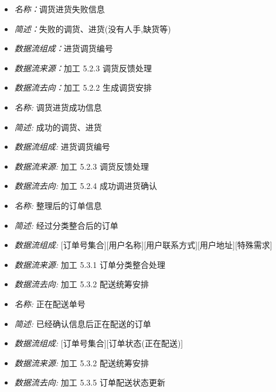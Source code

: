 \documentclass{article}
\begin{document}
\begin{CJK*}{UTF8}{gbsn}
\vspace{-1mm}

\begin{itemize}
\item \textit{名称：}调货进货失败信息
	\item \textit{简述：}失败的调货、进货(没有人手,缺货等)
	\item \textit{数据流组成：}进货调货编号
	\item \textit{数据流来源：}加工 5.2.3 调货反馈处理
	\item \textit{数据流去向：}加工 5.2.2 生成调货安排
\end{itemize}

\vspace{-1mm}

\begin{itemize}
\item \textit{名称: }调货进货成功信息 
\item \textit{简述: }成功的调货、进货 
\item \textit{数据流组成: }进货调货编号 
\item \textit{数据流来源: }加工 5.2.3 调货反馈处理 
\item \textit{数据流去向: }加工 5.2.4 成功调进货确认

\end{itemize}


\vspace{-1mm}



\begin{itemize}
\item \textit{名称: }整理后的订单信息
\item \textit{简述: }经过分类整合后的订单 
\item \textit{数据流组成: }[订单号集合][用户名称][用户联系方式][用户地址][特殊需求] 
\item \textit{数据流来源: }加工 5.3.1 订单分类整合处理
\item \textit{数据流去向: }加工 5.3.2 配送统筹安排

\end{itemize}


\vspace{-1mm}


\begin{itemize}
\item \textit{名称: }正在配送单号 
\item \textit{简述: }已经确认信息后正在配送的订单 
\item \textit{数据流组成: }[订单号集合][订单状态(正在配送)] 
\item \textit{数据流来源: }加工 5.3.2 配送统筹安排 
\item \textit{数据流去向: }加工 5.3.5 订单配送状态更新


\end{itemize}
\end{CJK*}
\end{document}

